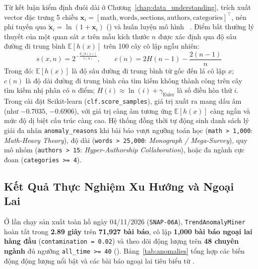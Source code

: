 Từ kết luận kiểm định đuôi dài ở Chương~\ref{chap:data_understanding},  trích xuất vector đặc trưng 5 chiều $\mathbf{x}_i = [\text{math}, \text{words}, \text{sections}, \text{authors}, \text{categories}]^\top$, nén phi tuyến qua $\tilde{\mathbf{x}}_i = \ln(1 + \mathbf{x}_i)$ () và huấn luyện mô hình ~\cite{liu2008isolation}. Điểm bất thường lý thuyết của một quan sát $x$ trên mẫu kích thước $n$ được xác định qua độ sâu đường đi trung bình $\mathbb{E}[h(x)]$ trên 100 cây cô lập ngẫu nhiên:
\begin{equation}
  s(x, n) = 2^{-\frac{\mathbb{E}[h(x)]}{c(n)}},
  \qquad
  c(n) = 2 H(n - 1) - \frac{2(n - 1)}{n}
  \label{eq:ch4_iforest}
\end{equation}
Trong đó: $\mathbb{E}[h(x)]$ là độ sâu đường đi trung bình từ gốc đến lá cô lập $x$; $c(n)$ là độ dài đường đi trung bình của tìm kiếm không thành công trên cây tìm kiếm nhị phân có $n$ điểm; $H(i) \approx \ln(i) + \gamma_{\text{Euler}}$ là số điều hòa thứ $i$. Trong cài đặt Scikit-learn (\texttt{clf.score\_samples}), giá trị xuất ra mang dấu âm (như $-0.7035$, $-0.6906$), với giá trị càng âm tương ứng $\mathbb{E}[h(x)]$ càng ngắn và mức độ dị biệt cấu trúc càng cao. Hệ thống đồng thời tự động sinh danh sách lý giải đa nhãn \texttt{anomaly\_reasons} khi bài báo vượt ngưỡng toán học (\texttt{math > 1,000}: \textit{Math-Heavy Theory}), độ dài (\texttt{words > 25,000}: \textit{Monograph / Mega-Survey}), quy mô nhóm (\texttt{authors > 15}: \textit{Hyper-Authorship Collaboration}), hoặc đa ngành cực đoan (\texttt{categories >= 4}).

\subsection{Kết Quả Thực Nghiệm Xu Hướng và Ngoại Lai}
\label{sec:ch4_trends_results}

Ở lần chạy sản xuất toàn hồ ngày 04/11/2026 (\texttt{SNAP-06A}), \texttt{TrendAnomalyMiner} hoàn tất trong \textbf{2.89 giây} trên \textbf{71,927 bài báo}, cô lập \textbf{1,000 bài báo ngoại lai hàng đầu} (\texttt{contamination = 0.02}) và theo dõi động lượng trên \textbf{48 chuyên ngành} đủ ngưỡng \texttt{all\_time >= 40} (). Bảng~\ref{tab:anomalies} tổng hợp các biến động động lượng nổi bật và các bài báo ngoại lai tiêu biểu từ .

